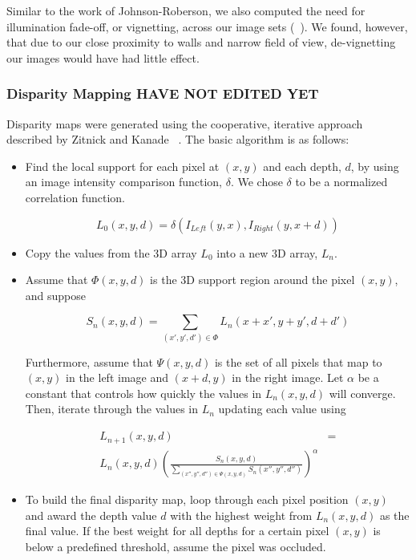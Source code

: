 \documentclass[twocolumn]{article}
\begin{document}
Similar to the work of Johnson-Roberson, we also computed the need for illumination fade-off, or vignetting, across our image sets (~\cite{stereo:Roberson}).  
We found, however, that due to our close proximity to walls and narrow field of view, de-vignetting our images would have had little effect.

\subsubsection{Disparity Mapping HAVE NOT EDITED YET}
\label{subsec:disparity_mapping}

Disparity maps were generated using the cooperative, iterative approach described by Zitnick and Kanade ~\cite{stereo:zitKan}.
The basic algorithm is as follows:
\begin{itemize}
\item Find the local support for each pixel at $(x,y)$ and each depth, $d$, by using an image intensity comparison function, $\delta$.
We chose $\delta$ to be a normalized correlation function.

\begin{equation}
L_0(x,y,d) = \delta(I_{Left}(y,x),I_{Right}(y,x+d))
\end{equation}

\item Copy the values from the 3D array $L_0$ into a new 3D array, $L_n$.

\item Assume that $\Phi(x,y,d)$ is the 3D support region around the pixel $(x,y)$, and suppose

\begin{equation}
S_n(x,y,d) = \sum_{(x',y',d') \in \Phi} L_n (x+x', y+y', d+d')
\end{equation}

Furthermore, assume that $\Psi(x,y,d)$ is the set of all pixels that map to $(x,y)$ in the left image and $(x+d,y)$ in the right image. 
Let $\alpha$ be a constant that controls how quickly the values in $L_n(x,y,d)$ will converge. Then, iterate through the values in $L_n$ updating each value using
 
\begin{align}
L_{n+1}(x,y,d) &= \\ 
L_n(x,y,d)\left(\frac{S_n(x,y,d)}{\sum\limits_{(x'',y'',d'') \in \Psi(x,y,d)} S_n(x'',y'',d'')} \right)^\alpha 
\end{align}

\item To build the final disparity map, loop through each pixel position $(x,y)$ and award the depth value $d$ with the highest weight from $L_n(x,y,d)$ as the final value.
If the best weight for all depths for a certain pixel $(x,y)$ is below a predefined threshold, assume the pixel was occluded.
\end{itemize}
\end{document}
